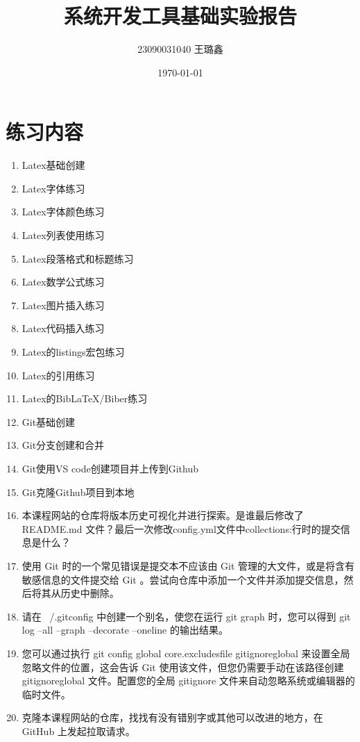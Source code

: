 \documentclass[UTF8]{article}
\title{系统开发工具基础实验报告}
\author{23090031040 王璐鑫}
\date{\today}
\begin{document}
\maketitle
\section{练习内容}

\begin{enumerate}
    \item Latex基础创建
    \item Latex字体练习
    \item Latex字体颜色练习
    \item Latex列表使用练习
    \item Latex段落格式和标题练习
    \item Latex数学公式练习
    \item Latex图片插入练习
    \item Latex代码插入练习
    \item Latex的listings宏包练习
    \item Latex的引用练习
    \item Latex的BibLaTeX/Biber练习
    \item Git基础创建
    \item Git分支创建和合并
    \item Git使用VS code创建项目并上传到Github
    \item Git克隆Github项目到本地
    \item 本课程网站的仓库将版本历史可视化并进行探索。是谁最后修改了 README.md 文件？最后一次修改config.yml文件中collections:行时的提交信息是什么？
    \item 使用 Git 时的一个常见错误是提交本不应该由 Git 管理的大文件，或是将含有敏感信息的文件提交给 Git 。尝试向仓库中添加一个文件并添加提交信息，然后将其从历史中删除。
    \item 请在 ~/.gitconfig 中创建一个别名，使您在运行 git graph 时，您可以得到 git log --all --graph --decorate --oneline 的输出结果。
    \item 您可以通过执行 git config global core.excludesfile gitignoreglobal 来设置全局忽略文件的位置，这会告诉 Git 使用该文件，但您仍需要手动在该路径创建 gitignoreglobal 文件。配置您的全局 gitignore 文件来自动忽略系统或编辑器的临时文件。
    \item 克隆本课程网站的仓库，找找有没有错别字或其他可以改进的地方，在 GitHub 上发起拉取请求。
\end{enumerate}
\end{document}
